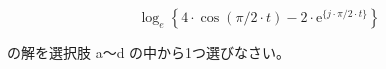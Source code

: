 \[
\log_e \left \{
4 \cdot \cos(\pi/2 \cdot t) - 2 \cdot \textrm{e}^{ \{j \cdot \pi/2 \cdot t\} }
\right \}
\]

\bigskip
\noindent の解を選択肢 a〜d の中から1つ選びなさい。
